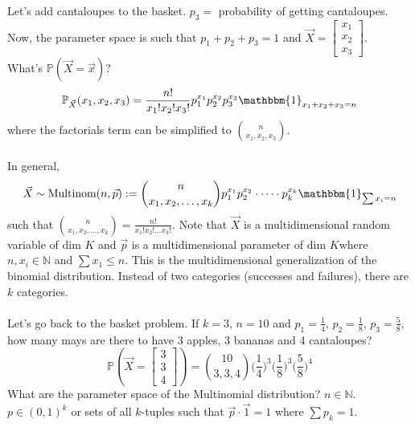 \documentclass[12pt]{article}
\newcommand{\prob}[1]{\mathbb{P}(#1)}
\newcommand{\probsub}[2]{\mathbb{P}_{#1}(#2)}
\newcommand{\indicator}[1]{\mathbbm{1}_{#1}}
\begin{document}
Let's add cantaloupes to the basket. $p_3 = $ probability of getting cantaloupes. Now, the parameter space is such that $p_1 + p_2 + p_3 = 1$ and $\vec{X} = \begin{bmatrix} x_1 \\ x_2 \\ x_3 \end{bmatrix}$. \\
What's $\prob{\vec{X} = \vec{x}}$? 
$$ \probsub{\vec{X}}{x_1, x_2, x_3} = \frac{n!}{x_1!x_2!x_3!}p_1^{x_1}p_2^{x_2}p_3^{x_3}\indicator{x_1 + x_2 + x_3 = n} $$ where the factorials term can be simplified to $\binom{n}{x_1, x_2, x_3}$. \\~\\
In general, $$\vec{X} \sim \text{Multinom}(n, \vec{p}) := \binom{n}{x_1, x_2, \dots, x_k} p_1^{x_1} p_2^{x_2} \cdot \dots \cdot p_k^{x_k}\indicator{\sum x_i = n}$$ such that $\binom{n}{x_1, x_2, \dots, x_k} = \frac{n!}{x_1!x_2!\dots x_k!}$. 
Note that $\vec{X}$ is a multidimensional random variable of dim $K$ and $\vec{p}$ is a multidimensional parameter of dim $K$where $n, x_i \in \mathbb{N}$ and $\sum x_1 \leq n$. This is the multidimensional generalization of the binomial distribution. Instead of two categories (successes and failures), there are $k$ categories. \\~\\
Let's go back to the basket problem. If $k = 3$, $n = 10$ and $p_1 = \frac{1}{4}$, $p_2 = \frac{1}{8}$, $p_3 = \frac{5}{8}$, how many mays are there to have 3 apples, 3 bananas and 4 cantaloupes? 
$$\prob{\vec{X} = \begin{bmatrix} 3 \\ 3 \\ 4 \end{bmatrix}} = \binom{10}{3, 3, 4} \Big( \frac{1}{4}\Big)^3 \Big(\frac{1}{8}\Big)^3 \Big(\frac{5}{8}\Big)^4 $$ 
What are the parameter space of the Multinomial distribution? $n \in \mathbb{N}$. $ p \in (0, 1)^k$ or sets of all $k$-tuples such that $\vec{p} \cdot \vec{1} = 1$ where $\sum p_k = 1$. \\~\\
\end{document}
